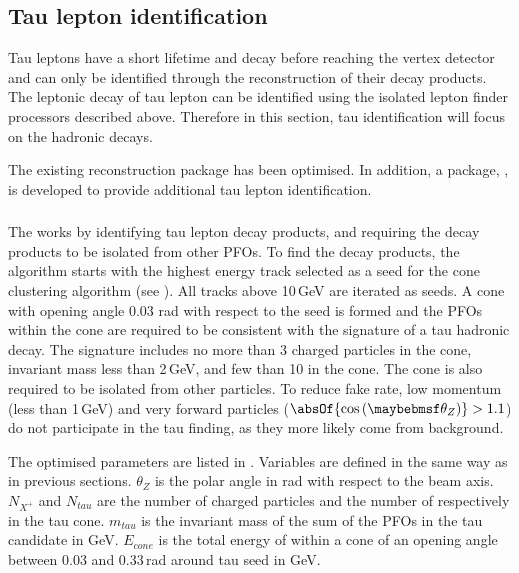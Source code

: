 \subsection{Tau lepton identification}

Tau leptons have a short lifetime and decay before reaching the vertex detector and can only be identified through the reconstruction of their decay products. The leptonic decay of tau lepton can be identified using the isolated lepton finder processors described above. Therefore in this section, tau identification will focus on the hadronic decays.

The existing \TauFinderProcessor  \cite{LCD-Note-2010-009} reconstruction package has been optimised. In addition, a package, \BonoTauFinder, is developed to provide additional tau lepton identification.




\subsubsection{\TauFinderProcessor}

The \TauFinderProcessor works by identifying tau lepton decay products, and requiring the decay products to be isolated from other PFOs. To find the decay products, the algorithm starts with the highest energy track selected as a seed for the cone clustering algorithm  (see  ). All tracks above 10\,GeV are iterated as seeds. A cone with opening angle 0.03 rad with respect to the seed is formed and the PFOs within the cone are required to be consistent with the signature of a tau hadronic decay. The signature includes no more than 3 charged particles in the cone, invariant mass less than 2\,GeV, and few than 10 \PFOs in the cone. The cone is also required to be isolated from other particles. To reduce fake rate, low momentum (less than 1\,GeV) and very forward particles ($\absOf{\cos\left(\theta_Z\right)} > 1.1$) do not participate in the tau finding, as they more likely come from \ggHad background.


The optimised parameters are listed in . Variables are defined in the same way as in previous sections. $\theta_Z$ is the polar angle in rad with respect to the beam axis. $N_{X^+}$ and $N_{tau}$ are the number of charged particles and the number of \PFOs respectively in the tau cone. $m_{tau}$ is the invariant mass of the sum of the PFOs in the tau candidate in GeV. $E_{cone}$ is the total energy of \PFOs within a cone of an opening angle between 0.03 and 0.33\,rad  around tau seed in GeV.

